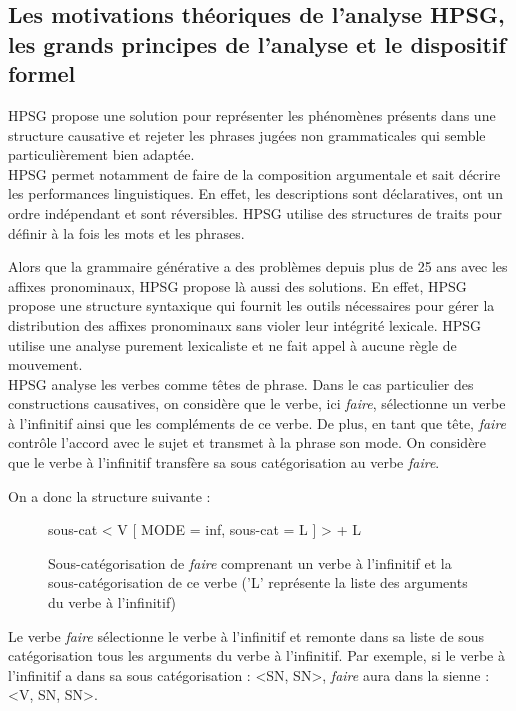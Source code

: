 \newpage

\subsection{Les motivations théoriques de l'analyse HPSG, les grands principes de l'analyse et le dispositif formel}

HPSG propose une solution pour représenter les phénomènes présents dans une structure causative et rejeter les phrases jugées non grammaticales qui semble particulièrement bien adaptée.\\

HPSG permet notamment de faire de la composition argumentale et sait décrire les performances linguistiques.
En effet, les descriptions sont déclaratives, ont un ordre indépendant et sont réversibles.
HPSG utilise des structures de traits pour définir à la fois les mots et les phrases.

Alors que la grammaire générative a des problèmes depuis plus de 25 ans avec les affixes pronominaux, HPSG propose là aussi des solutions.
En effet, HPSG propose une structure syntaxique qui fournit les outils nécessaires pour gérer la distribution des affixes pronominaux sans violer leur intégrité lexicale.
HPSG utilise une analyse purement lexicaliste et ne fait appel à aucune règle de mouvement.\\

HPSG  analyse les verbes comme têtes de phrase.
Dans le cas particulier des constructions causatives, on considère que le verbe, ici \emph{faire}, sélectionne un verbe à l'infinitif ainsi que les compléments de ce verbe.
De plus, en tant que tête, \emph{faire} contrôle l'accord avec le sujet et transmet à la phrase son mode.
On considère que le verbe à l'infinitif transfère sa sous catégorisation au verbe \emph{faire}.

On a donc la structure suivante :

\begin{figure}[ht]
\begin{avm}
			sous-cat  < V [ MODE = inf, sous-cat = L ] > + L

\end{avm}
\caption{Sous-catégorisation de \emph{faire} comprenant un verbe à l'infinitif et la sous-catégorisation de ce verbe ('L' représente la liste des arguments du verbe à l'infinitif)}
\end{figure}


Le verbe \emph{faire} sélectionne le verbe à l'infinitif et remonte dans sa liste de sous catégorisation tous les arguments du verbe à l'infinitif.
Par exemple, si le verbe à l'infinitif a dans sa sous catégorisation : <SN, SN>, \emph{faire} aura dans la sienne : <V, SN, SN>.

